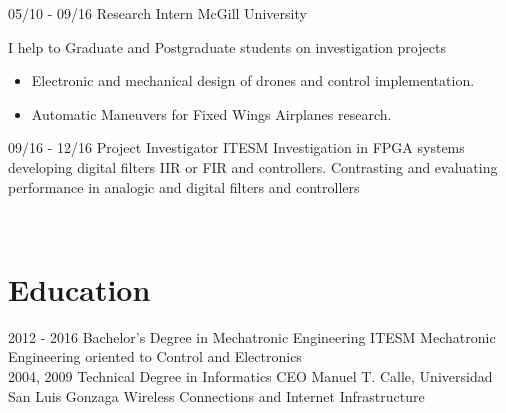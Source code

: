 \documentclass[]{friggeri-cv}
\begin{document}
\begin{entrylist}
    \entry
    {05/10 - 09/16}
    {Research Intern}
    {McGill University\vspace{1mm}}
    {I help to Graduate and Postgraduate students on investigation projects\\\vspace{-3mm}
        \begin{itemize}
    		\addtolength{\itemindent}{-4mm}
    			\item Electronic and mechanical design of drones and control implementation.\vspace{1mm}
    			\item Automatic Maneuvers for Fixed Wings Airplanes research.\vspace{1mm}
    	\end{itemize}
    }
    \entry
    {09/16 - 12/16}
    {Project Investigator}
    {ITESM\vspace{1mm}}
    {Investigation in FPGA systems developing digital filters IIR or FIR and controllers. Contrasting and evaluating performance in analogic and digital filters and controllers}
\end{entrylist}
\\\vspace{-4mm}
\section{Education}
\begin{entrylist}
  \entry
    {2012 - 2016}
    {Bachelor's Degree in Mechatronic Engineering}
    {ITESM\vspace{1mm}}
    {Mechatronic Engineering oriented to Control and Electronics\\\vspace{-2mm}}
  \entry
    {2004, 2009}
    {Technical Degree in Informatics}
    {CEO Manuel T. Calle, Universidad San Luis Gonzaga\vspace{1mm}}
    {Wireless Connections and Internet Infrastructure\\}
\end{entrylist}

\newpage
\end{document}
